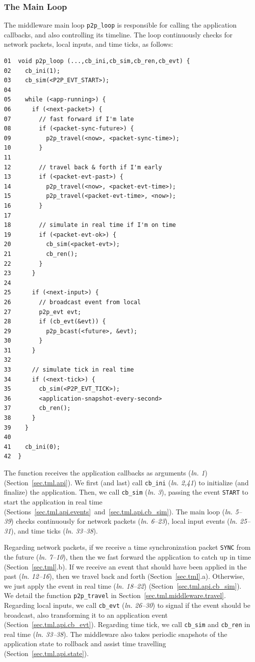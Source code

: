 \documentclass[10pt,journal,compsoc]{IEEEtran}
\newcommand{\code}[1]  {\texttt{\footnotesize{#1}}}
\newcommand{\lin}[1]{(\emph{ln. #1}\xspace)}
\begin{document}
\subsubsection{The Main Loop}
\label{sec.tml.middleware.loop}

The middleware main loop \code{p2p\_loop} is responsible for calling the
application callbacks, and also controlling its timeline.
The loop continuously checks for network packets, local inputs, and time ticks,
as follows:

{\footnotesize
\begin{verbatim}
01  void p2p_loop (...,cb_ini,cb_sim,cb_ren,cb_evt) {
02    cb_ini(1);
03    cb_sim(<P2P_EVT_START>);
04
05    while (<app-running>) {
06      if (<next-packet>) {
07        // fast forward if I'm late
08        if (<packet-sync-future>) {
09          p2p_travel(<now>, <packet-sync-time>);
10        }
11
12        // travel back & forth if I'm early
13        if (<packet-evt-past>) {
14          p2p_travel(<now>, <packet-evt-time>);
15          p2p_travel(<packet-evt-time>, <now>);
16        }
17
18        // simulate in real time if I'm on time
19        if (<packet-evt-ok>) {
20          cb_sim(<packet-evt>);
21          cb_ren();
22        }
23      }
24
25      if (<next-input>) {
26        // broadcast event from local
27        p2p_evt evt;
28        if (cb_evt(&evt)) {
29          p2p_bcast(<future>, &evt);
30        }
31      }
32
33      // simulate tick in real time
34      if (<next-tick>) {
35        cb_sim(<P2P_EVT_TICK>);
36        <application-snapshot-every-second>
37        cb_ren();
38      }
39    }
40
41    cb_ini(0);
42  }
\end{verbatim}
}

The function receives the application callbacks as arguments \lin{1}
(Section~\ref{sec.tml.api}).
We first (and last) call \code{cb\_ini} \lin{2,41} to initialize (and finalize)
the application.
Then, we call \code{cb\_sim} \lin{3}, passing the event \code{START} to start
the application in real time
(Sections~\ref{sec.tml.api.events}~and~\ref{sec.tml.api.cb_sim}).
The main loop \lin{5--39} checks continuously for network packets \lin{6--23},
local input events \lin{25--31}, and time ticks \lin{33--38}.

Regarding network packets, if we receive a time synchronization packet
\code{SYNC} from the future \lin{7--10}, then the we fast forward the
application to catch up in time (Section~\ref{sec.tml}.b).
If we receive an event that should have been applied in the past \lin{12--16},
then we travel back and forth (Section~\ref{sec.tml}.a).
Otherwise, we just apply the event in real time \lin{18--22}
(Section~\ref{sec.tml.api.cb_sim}).
We detail the function \code{p2p\_travel} in
Section~\ref{sec.tml.middleware.travel}.
%
Regarding local inputs, we call \code{cb\_evt} \lin{26--30} to signal if the
event should be broadcast, also transforming it to an application event
(Section~\ref{sec.tml.api.cb_evt}).
%
Regarding time tick, we call \code{cb\_sim} and \code{cb\_ren} in real time
\lin{33--38}.
The middleware also takes periodic snapshots of the application state to
rollback and assist time travelling (Section~\ref{sec.tml.api.state}).
\end{document}
